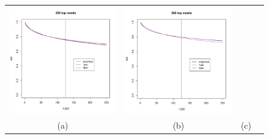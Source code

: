 \documentclass[12pt]{article}
\begin{document}
\begin{figure}
\begin{center}
\begin{tabular}{cccc}
\includegraphics[scale=0.3]{../Yuval/ident_extrap2.pdf} &
\includegraphics[scale=0.3]{../Yuval/ident_extrap3.pdf} \\
(a) & (b) & (c) \\

\end{tabular}
\end{center}
\end{figure}
\end{document}
